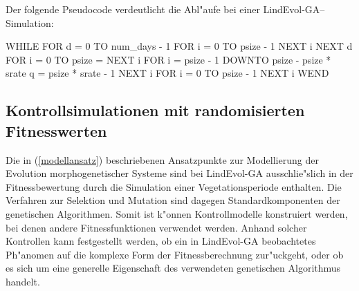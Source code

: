 Der folgende Pseudocode verdeutlicht die Abl"aufe bei einer LindEvol-GA--Simulation:

\begin{verbatimcmd}
WHILE 
  FOR d = 0 TO num_days - 1
    FOR i = 0 TO psize - 1
    NEXT i
  NEXT d
  FOR i = 0 TO psize
     = 
  NEXT i
  FOR i = psize - 1 DOWNTO psize - psize * srate
    q =  psize * srate - 1
  NEXT i
  FOR i = 0 TO psize - 1
  NEXT i
WEND
\end{verbatimcmd}


\subsection{Kontrollsimulationen mit randomisierten Fitnesswerten}
\label{lndga-neutral}

Die in (\ref{modellansatz}) beschriebenen Ansatzpunkte zur Modellierung der Evolution
morphogenetischer Systeme sind bei LindEvol-GA ausschlie"slich in der Fitnessbewertung
durch die Simulation einer Vegetationsperiode enthalten. Die Verfahren zur Selektion
und Mutation sind dagegen Standardkomponenten der genetischen Algorithmen. Somit ist
k"onnen Kontrollmodelle konstruiert werden, bei denen andere Fitnessfunktionen
verwendet werden. Anhand solcher Kontrollen kann festgestellt werden, ob ein in
LindEvol-GA beobachtetes Ph"anomen auf die komplexe Form der Fitnessberechnung
zur"uckgeht, oder ob es sich um eine generelle Eigenschaft des verwendeten
genetischen Algorithmus handelt.


